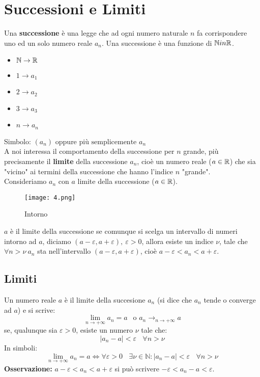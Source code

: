 \documentclass[../../main.tex]{subfiles}
\begin{document}
\section{Successioni e Limiti}
Una \textbf{successione} è una legge che ad ogni numero naturale $n$ fa
corrispondere uno ed un solo numero reale $a_n$. Una successione è una funzione
di $\mathbb{N} in \mathbb{R}$.
\begin{itemize}
    \item $\mathbb{N} \to \mathbb{R}$
    \item $1 \to a_1$
    \item $2 \to a_2$
    \item $3 \to a_3$
    \item $n \to a_n$
\end{itemize}
Simbolo: $(a_n) \text{ oppure più semplicemente } a_n$\\
A noi interessa il comportamento della successione per $n$ grande, più precisamente il \textbf{limite} della successione $a_n$, cioè un numero reale ($a \in \mathbb{R}$) che sia "vicino" ai termini della successione che hanno l'indice $n$ "grande".\\
Consideriamo $a_n$ con $a$ limite della successione ($a \in \mathbb{R}$).
\begin{figure}[h!]
    \centering
    \texttt{[image: 4.png]}
    \caption{Intorno}
    \label{fig:4}
\end{figure}
$a$ è il limite della successione se comunque si scelga un intervallo di numeri intorno ad $a$, diciamo $(a-\varepsilon, a+\varepsilon), \ \varepsilon > 0$, allora esiste un indice $\nu$, tale che $\forall n > \nu \ a_n$ sta nell'intervallo $(a-\varepsilon, a+\varepsilon)$, cioè $a-\varepsilon < a_n < a+\varepsilon$.

\subsection{Limiti}
Un numero reale $a$ è il limite della succesione $a_n$ (si dice che $a_n$ tende
o converge ad $a$) e si scrive:
\[
    \lim_{n\to +\infty} a_n = a \ \ \text{ o } a_n \to_{n\to+\infty} a
\]
se, qualunque sia $\varepsilon > 0$, esiste un numero $\nu$ tale che:
\[
    |a_n - a| < \varepsilon \ \ \ \ \forall n > \nu
\]
In simboli:
\[
    \lim_{n\to+\infty}a_n = a \iff \forall \varepsilon > 0 \ \ \ \ \exists \nu \in \mathbb{N} : |a_n - a| < \varepsilon \ \ \ \ \forall n > \nu
\]
\textbf{Osservazione:} $a-\varepsilon < a_n < a+\varepsilon$ si può scrivere $-\varepsilon < a_n - a < \varepsilon$.\\
\end{document}
